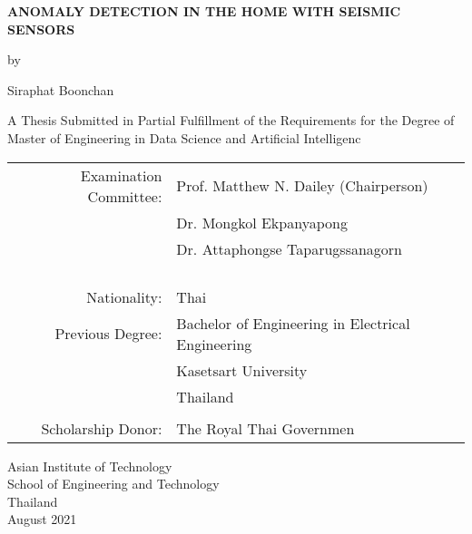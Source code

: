 \begin{titlepage}
  \begin{center}
  \setlength{\baselineskip}{1.6em}

  \textbf{\large{
    ANOMALY DETECTION IN THE HOME  WITH SEISMIC SENSORS
  }}

  \vspace{3em} %
  
  by
  
  \vspace{3em} %
  
  Siraphat Boonchan
  
  \vspace{4em} %

  A Thesis Submitted in Partial Fulfillment of the Requirements for the Degree of Master of Engineering in Data Science and Artificial Intelligenc

  \vspace{4em} %

\begin{center}
  \begin{tabular}{ rl }
Examination Committee: & Prof. Matthew N. Dailey (Chairperson) \\
                       & Dr. Mongkol Ekpanyapong \\ 
                       & Dr. Attaphongse Taparugssanagorn \\\\
                       
\\ \\ \\
Nationality:     & Thai \\ 
Previous Degree: & Bachelor of Engineering in Electrical Engineering \\
                 & Kasetsart University \\
                 & Thailand \\
\\
Scholarship Donor: & The Royal Thai Governmen
  \end{tabular}
\end{center}

\vspace{4em}

Asian Institute of Technology \\
School of Engineering and Technology \\
Thailand \\ 
August 2021


  \end{center}
\end{titlepage}
